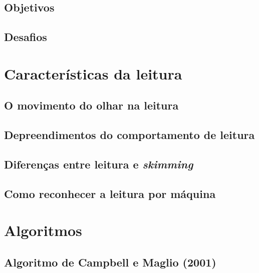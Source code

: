 \documentclass[12pt]{article}
\begin{document}
		\subsection{Objetivos}
		
		\subsection{Desafios}
	
	\section{Características da leitura}
	
		\subsection{O movimento do olhar na leitura}
		
		\subsection{Depreendimentos do comportamento de leitura}
		
		\subsection{Diferenças entre leitura e \textit{skimming}}
		
		\subsection{Como reconhecer a leitura por máquina}
		
	\section{Algoritmos}
	
		\subsection{Algoritmo de Campbell e Maglio (2001)}
		
\end{document}

